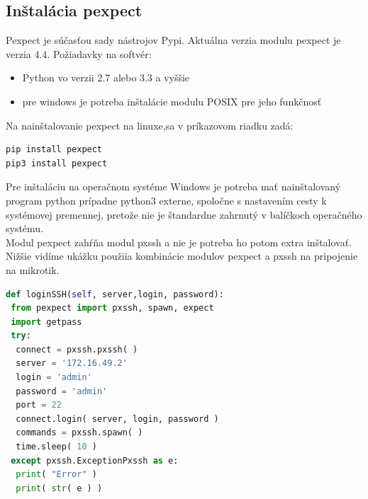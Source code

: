 \subsection{Inštalácia pexpect}
Pexpect je súčasťou sady nástrojov Pypi. Aktuálna verzia modulu pexpect je verzia 4.4. Požiadavky na softvér:\begin{itemize}
\item Python vo verzii 2.7 alebo 3.3 a vyššie
\item pre windows je potreba inštalácie modulu POSIX pre jeho funkčnosť
\end{itemize}
Na nainštalovanie pexpect \cite{pexpectinstall} na linuxe,sa v príkazovom riadku zadá:
\begin{lstlisting}[language=python, frame=single, caption=Inštalácia Pexpect, captionpos=b, basicstyle=\footnotesize]
pip install pexpect
pip3 install pexpect
\end{lstlisting}  
Pre inštaláciu na operačnom systéme Windows je potreba mať nainštalovaný program python prípadne python3 externe, spoločne s nastavením cesty k systémovej premennej, pretože nie je štandardne zahrnutý v balíčkoch operačného systému.\\
Modul pexpect zahŕňa modul pxssh a nie je potreba ho potom extra inštalovať.\\
Nižšie vidíme ukážku použiia kombinácie modulov pexpect a pxssh na pripojenie na mikrotik.
\newpage
\begin{lstlisting}[language=python, frame=single, caption=Použitie pxssh na pripojenie na router cez protokol SSH, captionpos=b, basicstyle=\footnotesize]
def loginSSH(self, server,login, password):
 from pexpect import pxssh, spawn, expect
 import getpass
 try:
  connect = pxssh.pxssh( )
  server = '172.16.49.2'
  login = 'admin'
  password = 'admin'
  port = 22
  connect.login( server, login, password )
  commands = pxssh.spawn( )
  time.sleep( 10 )
 except pxssh.ExceptionPxssh as e:
  print( "Error" )
  print( str( e ) )
\end{lstlisting}  
